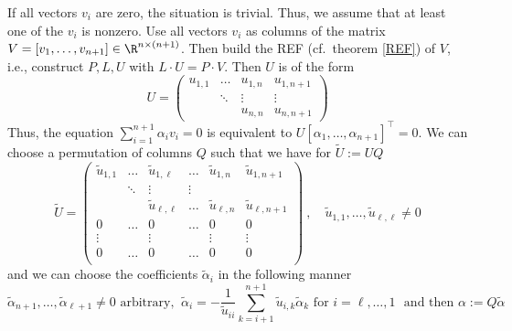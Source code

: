 {
\color{solution}
	If all vectors $v_i$ are zero, the situation is trivial. Thus, we assume that at least one of the $v_i$ is nonzero.
	Use all vectors $v_i$ as columns of the matrix $V=[v_1,\ldots, v_{n+1}]\in\R^{n\times(n+1)}$. Then build the REF (cf.~theorem \ref{REF}) of $V$, i.e., construct $P,L,U$ with $L\cdot U=P\cdot V$. 
	Then $U$ is of the form
	$$
	U=\begin{pmatrix}	
	u_{1,1}&\ldots&u_{1,n}&u_{1,n+1}\\
	       & \ddots&\vdots&\vdots \\
	       &       &u_{n,n}&u_{n,n+1}
	\end{pmatrix}
	$$
	Thus, the equation $\sum_{i=1}^{n+1}\alpha_iv_i=0$ is equivalent to $U[\alpha_1,\ldots,\alpha_{n+1}]^\top=0$. We can choose a permutation of columns $Q$ such that we have for $\tilde{U}:=UQ$
	$$
	\tilde{U}=\begin{pmatrix}
	\tilde{u}_{1,1}&\ldots&\tilde{u}_{1,\ell}&\ldots & \tilde{u}_{1,n}&\tilde{u}_{1,n+1}\\
	& \ddots&\vdots&\vdots \\
	&       &\tilde{u}_{\ell,\ell}&\ldots &\tilde{u}_{\ell,n}&\tilde{u}_{\ell,n+1}\\
	0    &  \ldots &   0      & \ldots & 0 & 0\\
	\vdots &       & \vdots &          &\vdots&\vdots\\
	0    &  \ldots &   0      & \ldots & 0 & 0\\
	\end{pmatrix}\ , \quad \tilde{u}_{1,1},\ldots ,\tilde{u}_{\ell,\ell}\neq 0
	$$ and we can choose the coefficients $\tilde{\alpha}_i$ in the following manner
	\[
	\tilde{\alpha}_{n+1},\ldots,\tilde{\alpha}_{\ell+1}\neq 0\text{ arbitrary, }\ \tilde{\alpha}_i=-\frac{1}{\tilde{u}_{ii}}\sum_{k=i+1}^{n+1}\tilde{u}_{i,k}\tilde{\alpha}_{k}\text{ for }i=\ell,\ldots ,1\text{~~and then }\alpha:=Q\tilde{\alpha}
	\]


}
